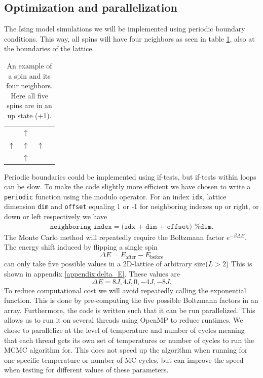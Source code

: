 \documentclass[english,notitlepage,reprint,nofootinbib]{revtex4-1}  %
\begin{document}
\subsection*{Optimization and parallelization}
The Ising model simulations we will be implemented using periodic boundary conditions. This way, all spins will have four neighbors as seen in table \ref{tab:neighbors}, also at the boundaries of the lattice.
\begin{table}[H]
    \centering
    \label{tab:neighbors}
    \caption{An example of a spin and its four neighbors. Here all five spins are in an up state (+1).}
    \begin{tabular}{llll}
                   & $\uparrow$ &            \\
        $\uparrow$ & $\uparrow$ & $\uparrow$ \\
                   & $\uparrow$ &
    \end{tabular}
\end{table}
Periodic boundaries could be implemented using if-tests, but if-tests within loops can be slow. To make the code slightly more efficient we have chosen to write a \texttt{periodic} function using the modulo operator. For an index \texttt{idx}, lattice dimension \texttt{dim} and \texttt{offset} equaling 1 or -1 for neighboring indexes up or right, or down or left respectively we have
\begin{align*}
    \texttt{neighboring index} = \texttt{(idx + dim + offset) \% dim}.
\end{align*}
The Monte Carlo method will repeatedly require the Boltzmann factor $e^{-\beta \Delta E}$. The energy shift induced by flipping a single spin
\begin{equation}
    \Delta E = E_{\text{after}} - E_{\text{before}}
\end{equation}
can only take five possible values in a 2D-lattice of arbitrary size($L > 2$) This is shown in appendix \ref{appendix:delta_E}. These values are
\begin{equation}
    \Delta E = 8J, 4J, 0, -4J, -8J.
\end{equation}
To reduce computational cost we will avoid repeatedly calling the exponential function. This is done by pre-computing the five possible Boltzmann factors in an array.
Furthermore, the code is written such that it can be run parallelized. This allows us to run it on several threads using OpenMP to reduce runtimes. We chose to parallelize at the level of temperature and number of cycles meaning that each thread gets its own set of temperatures or number of cycles to run the MCMC algorithm for. This does not speed up the algorithm when running for one specific temperature or number of MC cycles, but can improve the speed when testing for different values of these parameters.
\onecolumngrid
\newpage
\twocolumngrid
\end{document}
